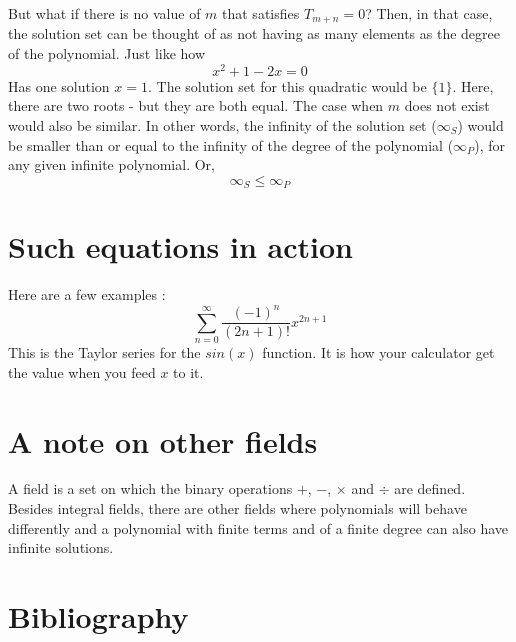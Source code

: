 \documentclass[preprint,12pt]{elsarticle}
\begin{document}
But what if there is no value of $m$ that satisfies $T_{m+n}=0$? Then, in that case, the solution set can be thought of as not having as many elements as the degree of the polynomial.
Just like how 
\[
    x^2 + 1 - 2x = 0
\]
Has one solution $x=1$.
The solution set for this quadratic would be $\{1\}$.
Here, there are two roots - but they are both equal. The case when $m$ does not exist would also be similar.
In other words, the infinity of the solution set ($\infty_{S}$) would be smaller than or equal to the infinity of the degree of the polynomial ($\infty_{P}$), for any given infinite polynomial.
Or,
\begin{equation}
    \infty_{S} \leqslant \infty_{P}
\end{equation}
\section{Such equations in action}
Here are a few examples :
\[
\sum_{n=0}^{\infty} \dfrac{(-1)^n}{(2n+1)!} x^{2n+1}
\]
This is the Taylor series for the $sin(x)$ function. It is how your calculator get the value when you feed $x$ to it.
\section*{A note on other fields}
A field is a set on which the binary operations $+$, $-$, $\times$ and $\div$ are defined.
Besides integral fields, there are other fields where polynomials will behave differently and a polynomial with finite terms and of a finite degree can also have infinite solutions.





\appendix
\section*{Bibliography}







\end{document}
